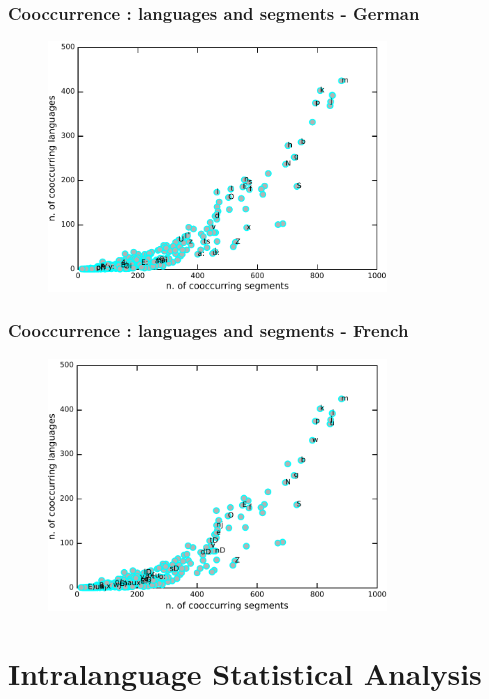 \documentclass{beamer}
\begin{document}
\frame
{
  \frametitle{Cooccurrence : languages and segments - German}
  \vspace{-0.3cm}
  \begin{figure}[h!]
  \centering
  \includegraphics[width=0.8\textwidth]{images/coocc_of_speech_sounds_german.pdf}
  \label{fig:coocc_of_speech_sounds_german}
  \end{figure}
}


\frame
{
  \frametitle{Cooccurrence : languages and segments - French}
  \vspace{-0.3cm}
  \begin{figure}[h!]
  \centering
  \includegraphics[width=0.8\textwidth]{images/coocc_of_speech_sounds_french.pdf}
  \label{fig:coocc_of_speech_sounds_french}
  \end{figure}
}



\section{Intralanguage Statistical Analysis}
\end{document}
